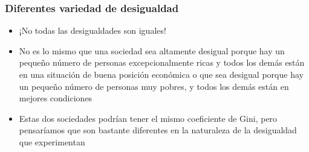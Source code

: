 \documentclass{beamer}
\begin{document}
\begin{frame} 
\frametitle{Diferentes variedad de desigualdad}
\begin{itemize}
\item ¡No todas las desigualdades son iguales!
\item No es lo mismo que una sociedad sea altamente desigual porque hay un pequeño número de personas excepcionalmente ricas y todos los demás están en una situación de buena posición económica o que sea desigual porque hay un pequeño número de personas muy pobres, y todos los demás están en mejores condiciones
\item Estas dos sociedades podrían tener el mismo coeficiente de Gini, pero pensaríamos que son bastante diferentes en la naturaleza de la desigualdad que experimentan
\end{itemize}
\end{frame}
\end{document}

